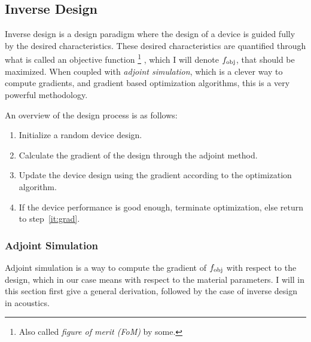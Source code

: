 \documentclass[11pt]{article}
\begin{document}




\subsection{Inverse Design}

Inverse design is a design paradigm where the design of a device is guided fully by
the desired characteristics.
These desired characteristics are quantified through what is called an objective
function%
\footnote{
	Also called \emph{figure of merit (FoM)} by some.%
}%
, which I will denote $f_\text{obj}$,
that should be maximized.
When coupled with \emph{adjoint simulation}, which is a clever way to compute
gradients, and gradient based optimization
algorithms, this is a very powerful methodology.

An overview of the design process is as follows:
\begin{enumerate}
	\item Initialize a random device design.
	\item\label{it:grad} Calculate the gradient of the design through the adjoint method.
	\item Update the device design using the gradient according to the optimization algorithm.
	\item If the device performance is good enough, terminate optimization, else
		return to step~\ref{it:grad}.
\end{enumerate}

\subsubsection{Adjoint Simulation}

Adjoint simulation is a way to compute the gradient of $f_\text{obj}$ with respect to
the design, which in our case means with respect to the material parameters.
I will in this section first give a general derivation, followed by the case of
inverse design in acoustics.
\end{document}
